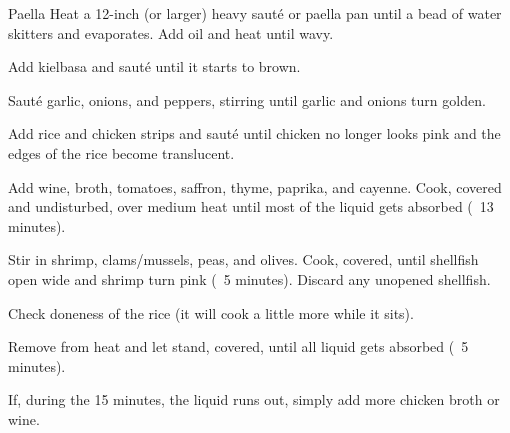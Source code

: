 \begin{recipe}{Paella}{}{}
Heat a 12-inch (or larger) heavy saut\'{e} or paella pan until a bead of water
skitters and evaporates. Add oil and heat until wavy.

Add kielbasa and saut\'{e} until it starts to brown.

Saut\'{e} garlic, onions, and peppers, stirring until garlic and onions turn
golden.

Add rice and chicken strips and saut\'{e} until chicken no longer looks pink
and the edges of the rice become translucent.

Add wine, broth, tomatoes, saffron, thyme, paprika, and cayenne. Cook, covered
and undisturbed, over medium heat until most of the liquid gets absorbed (~13
minutes).

Stir in shrimp, clams/mussels, peas, and olives. Cook, covered, until shellfish
open wide and shrimp turn pink (~5 minutes). Discard any unopened
shellfish.\newstep

Check doneness of the rice (it will cook a little more while it sits).\newstep

Remove from heat and let stand, covered, until all liquid gets absorbed (~5
minutes).

\freeform If, during the 15 minutes, the liquid runs out, simply add more
chicken broth or wine.

\end{recipe}
